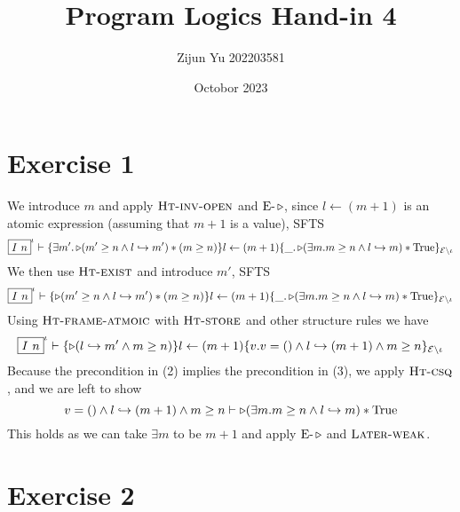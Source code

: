 \documentclass{article}
\title{Program Logics Hand-in 4}
\author{Zijun Yu 202203581}
\date{Octobor 2023}
\begin{document}


\maketitle

\section*{Exercise 1}

We introduce $m$ and apply $\textsc{Ht-inv-open}$ and $\text{E-}\later$,
since $l \leftarrow (m+1)$ is an atomic expression (assuming that $m+1$ is a value), SFTS
\begin{equation}
    \boxed{I \ n}^\iota \vdash
    \{\exists m'. \later ( m' \geq n \wedge l \gmapsto m' ) \star ( m \geq n ) \}
    l \leftarrow (m+1)
    \{\_.\later ( \exists m. m \geq n \wedge l \gmapsto m ) \star \text{True}\}_{\mathcal{E}\setminus\iota}
\end{equation}
We then use $\textsc{Ht-exist}$ and introduce $m'$, SFTS
\begin{equation}
    \boxed{I \ n}^\iota \vdash
    \{\later ( m' \geq n \wedge l \gmapsto m' ) \star ( m \geq n ) \}
    l \leftarrow (m+1)
    \{\_.\later ( \exists m. m \geq n \wedge l \gmapsto m ) \star \text{True}\}_{\mathcal{E}\setminus\iota}
\end{equation}
Using $\textsc{Ht-frame-atmoic}$ with $\textsc{Ht-store}$ and other structure rules we have
\begin{equation}
    \boxed{I \ n}^\iota \vdash
    \{\later ( l \gmapsto m' \wedge m \geq n )\}
    l \leftarrow (m+1)
    \{v. v =() \wedge l \gmapsto (m+1) \wedge m \geq n \}_{\mathcal{E}\setminus\iota}
\end{equation}
Because the precondition in (2) implies the precondition in (3), we apply $\textsc{Ht-csq}$,
and we are left to show
$$ v =() \wedge l \gmapsto (m+1) \wedge m \geq n
    \vdash \later ( \exists m. m \geq n \wedge l \gmapsto m ) \star \text{True}$$
This holds as we can take $\exists m$ to be $m+1$ and apply $\text{E-}\later$ and
$\textsc{Later-weak}$.

\section*{Exercise 2}

\begin{prooftree}
\end{prooftree}
\end{document}
